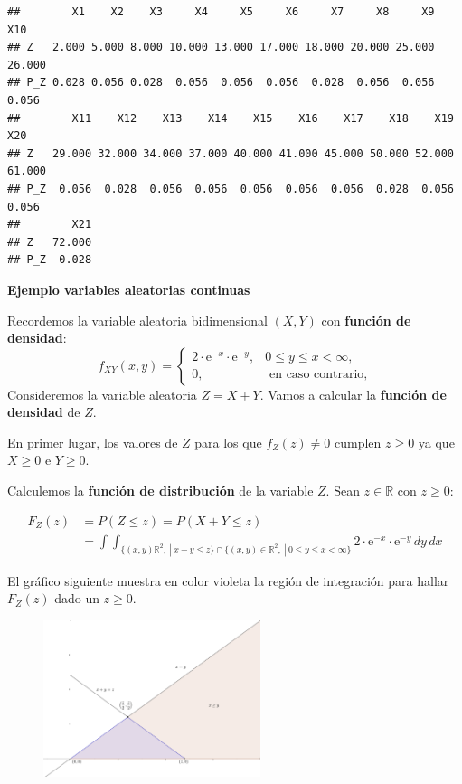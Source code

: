 \documentclass[]{book}
\begin{document}
\begin{verbatim}
##        X1    X2    X3     X4     X5     X6     X7     X8     X9    X10
## Z   2.000 5.000 8.000 10.000 13.000 17.000 18.000 20.000 25.000 26.000
## P_Z 0.028 0.056 0.028  0.056  0.056  0.056  0.028  0.056  0.056  0.056
##        X11    X12    X13    X14    X15    X16    X17    X18    X19    X20
## Z   29.000 32.000 34.000 37.000 40.000 41.000 45.000 50.000 52.000 61.000
## P_Z  0.056  0.028  0.056  0.056  0.056  0.056  0.056  0.028  0.056  0.056
##        X21
## Z   72.000
## P_Z  0.028
\end{verbatim}

\textbf{Ejemplo variables aleatorias continuas}

Recordemos la variable aleatoria bidimensional \((X,Y)\) con \textbf{función de densidad}:
\[
f_{XY}(x,y)=\begin{cases}
2\cdot  \mathrm{e}^{-x}\cdot \mathrm{e}^{-y}, & 0\leq y\leq x < \infty,\\
0, & \mbox{ en caso contrario,}
\end{cases}
\]
Consideremos la variable aleatoria \(Z=X+Y\). Vamos a calcular la \textbf{función de densidad} de \(Z\).

En primer lugar, los valores de \(Z\) para los que \(f_Z(z)\neq 0\) cumplen \(z\geq 0\) ya que \(X\geq 0\) e \(Y\geq 0\).

Calculemos la \textbf{función de distribución} de la variable \(Z\). Sean \(z\in\mathbb{R}\) con \(z\geq 0\):

\[
\begin{array}{rl}
F_Z(z) & =  P(Z\leq z)=P(X+Y\leq z)\\
& =\displaystyle \int\int_{\{(x,y)\mathbb{R}^2,\ |\ x+y\leq z\}\cap \{(x,y)\in \mathbb{R}^2,\ |\ 0\leq y\leq x<\infty\}} 2\cdot  \mathrm{e}^{-x}\cdot \mathrm{e}^{-y}\, dy\, dx
\end{array}
\]

El gráfico siguiente muestra en color violeta la región de integración para hallar \(F_Z(z)\) dado un \(z\geq 0\).

\begin{figure}
\includegraphics[width=2.5in]{Images/EjSumaXY} \end{figure}
\end{document}
